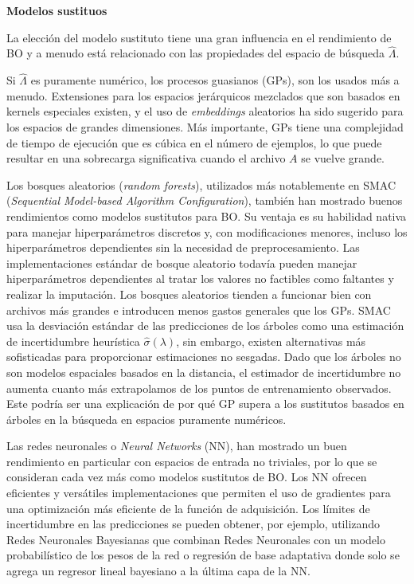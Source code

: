 \quad

\textbf{Modelos sustituos}

\quad

La elección del modelo sustituto tiene una gran influencia en el rendimiento de BO y a menudo está relacionado con las propiedades del espacio de búsqueda $\hat{\varLambda}$. 

Si $\hat{\varLambda}$ es puramente numérico, los procesos guasianos (GPs), son los usados más a menudo. Extensiones para los espacios jerárquicos mezclados que son basados en kernels especiales existen, y el uso de \emph{embeddings} aleatorios ha sido sugerido para los espacios de grandes dimensiones. Más importante, GPs tiene una complejidad de tiempo de ejecución que es cúbica en el número de ejemplos, lo que puede resultar en una sobrecarga significativa cuando el archivo $A$ se vuelve grande.

Los bosques aleatorios (\emph{random forests}), utilizados más notablemente en SMAC (\emph{Sequential Model-based Algorithm Configuration}), también han mostrado buenos rendimientos como modelos sustitutos para BO. Su ventaja es su habilidad nativa para manejar hiperparámetros discretos y, con modificaciones menores, incluso los hiperparámetros dependientes sin la necesidad de preprocesamiento. Las implementaciones estándar de bosque aleatorio todavía pueden manejar hiperparámetros dependientes al tratar los valores no factibles como faltantes y realizar la imputación. Los bosques aleatorios tienden a funcionar bien con archivos más grandes e introducen menos gastos generales que los GPs. SMAC usa la desviación estándar de las predicciones de los árboles como una estimación de incertidumbre heurística $\hat{\sigma}(\lambda)$,  sin embargo, existen alternativas más sofisticadas para proporcionar estimaciones no sesgadas. Dado que los árboles no son modelos espaciales basados en la distancia, el estimador de incertidumbre no aumenta cuanto más extrapolamos de los puntos de entrenamiento observados. Este podría ser una explicación de por qué GP supera a los sustitutos basados en árboles en la búsqueda en espacios puramente numéricos.

Las redes neuronales o \emph{Neural Networks} (NN), han mostrado un buen rendimiento en particular con espacios de entrada no triviales, por lo que se consideran cada vez más como modelos sustitutos de BO. Los NN ofrecen eficientes y versátiles implementaciones que permiten el uso de gradientes para una optimización más eficiente de la función de adquisición. Los límites de incertidumbre en las predicciones se pueden obtener, por ejemplo, utilizando Redes Neuronales Bayesianas que combinan Redes Neuronales con un modelo probabilístico de los pesos de la red o regresión de base adaptativa donde solo se agrega un regresor lineal bayesiano a la última capa de la NN.

